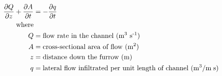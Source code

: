 \documentclass[fleqn, oneside, 11pt]{article}%
\begin{document}
\begin{preview}
\begin{align*}%
\frac{\partial Q}{\partial z} + \frac{\partial A}{\partial t}  & = -\frac{\partial q}{\partial t} \\ 
\text{where} \nonumber \\
Q & =  \text{flow rate in the channel (m\textsuperscript{3} s\textsuperscript{-1})} \nonumber \\
A & =  \text{cross-sectional area of flow (m\textsuperscript{2})}  \nonumber \\
z & =  \text{distance down the furrow (m)} \nonumber \\
q & =  \text{lateral flow infiltrated per unit length of channel (m\textsuperscript{3}/m\;s)} \nonumber \\
\end{align*} 
\end{preview}
\end{document}
